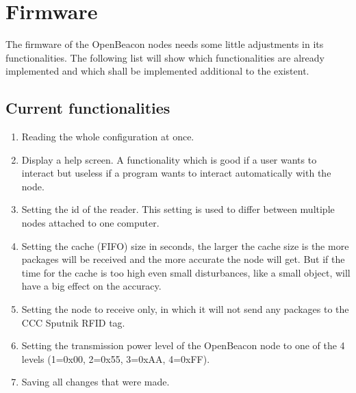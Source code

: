   \section{Firmware}
   \label{sec:design:firmware}
   The firmware of the OpenBeacon nodes needs some little adjustments in its functionalities. The following list will show which functionalities are already implemented and which shall be implemented additional to the existent.

   \subsection{Current functionalities}
    \begin{enumerate}
     \item Reading the whole configuration at once.
     \item Display a help screen. A functionality which is good if a user wants to interact but useless if a program wants to interact automatically with the node.
     \item Setting the id of the reader. This setting is used to differ between multiple nodes attached to one computer.
     \item Setting the cache (FIFO) size in seconds, the larger the cache size is the more packages will be received and the more accurate the node will get. But if the time for the cache is too high even small disturbances, like a small object, will have a big effect on the accuracy.
     \item Setting the node to receive only, in which it will not send any packages to the CCC Sputnik RFID tag.
     \item Setting the transmission power level of the OpenBeacon node to one of the 4 levels (1=0x00, 2=0x55, 3=0xAA, 4=0xFF).
     \item Saving all changes that were made.
    \end{enumerate}

